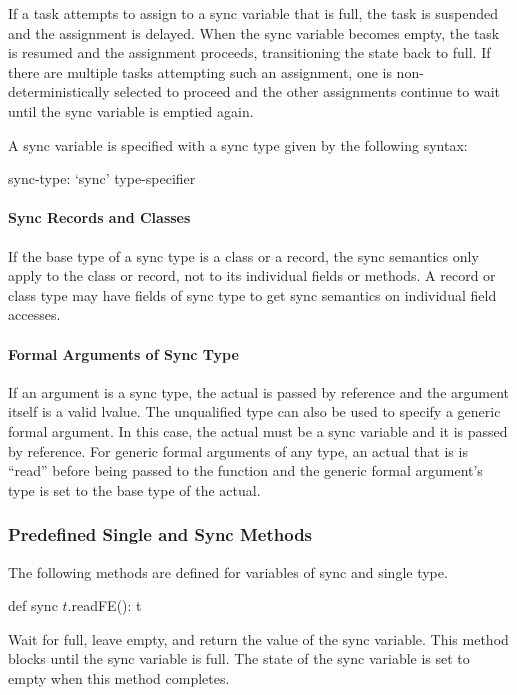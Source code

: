 If a task attempts to assign to a sync variable that is full, the task
is suspended and the assignment is delayed.  When the sync variable
becomes empty, the task is resumed and the assignment proceeds,
transitioning the state back to full.  If there are multiple tasks
attempting such an assignment, one is non-deterministically selected
to proceed and the other assignments continue to wait until the sync
variable is emptied again.

A sync variable is specified with a sync type given by the following
syntax:
\begin{syntax}
sync-type:
  `sync' type-specifier
\end{syntax}

\paragraph{Sync Records and Classes}
If the base type of a sync type is a class or a record, the sync
semantics only apply to the class or record, not to its individual
fields or methods.  A record or class type may have fields of sync
type to get sync semantics on individual field accesses.

\paragraph{Formal Arguments of Sync Type}
If an argument is a sync type, the actual is passed by reference and
the argument itself is a valid lvalue.  The unqualified
type  can also be used to specify a generic formal
argument.  In this case, the actual must be a sync variable and it
is passed by reference.  For generic formal arguments of any type, an
actual that is  is ``read'' before being passed to the
function and the generic formal argument's type is set to the base
type of the actual.

\subsubsection{Predefined Single and Sync Methods}
\label{Functions_on_Synchronization_Variables}

The following methods are defined for variables of sync and single
type.

\begin{protohead}
def sync $t$.readFE(): t
\end{protohead}
\begin{protobody}
Wait for full, leave empty, and return the value of the sync variable.
This method blocks until the sync variable is full.  The state of the
sync variable is set to empty when this method completes.
\end{protobody}

